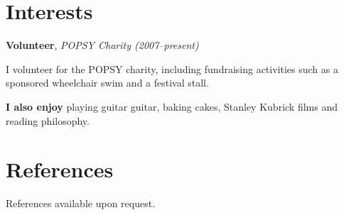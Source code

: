 \documentclass[11pt,a4paper,sans]{moderncv}
\begin{document}
\section{Interests}

{\large\textbf{Volunteer}, \textit{POPSY Charity (2007--present)}}

I volunteer for the POPSY charity, including fundraising activities such as a
sponsored wheelchair swim and a festival stall.
    
\vspace{0.75em}

{\large\textbf{I also enjoy}} playing guitar guitar, baking cakes,
Stanley Kubrick films and reading philosophy.

\section{References}

References available upon request.
\end{document}
